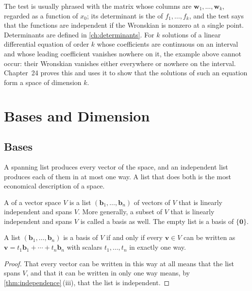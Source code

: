 The test is usually phrased with the matrix whose columns are $\mathbf w_1,\ldots,\mathbf w_k$, regarded as a function of $x_0$; its determinant is the  of $f_1,\ldots,f_k$, and the test says that the functions are independent if the Wronskian is nonzero at a single point. Determinants are defined in \cref{ch:determinants}. For $k$ solutions of a linear differential equation of order $k$ whose coefficients are continuous on an interval and whose leading coefficient vanishes nowhere on it, the example above cannot occur: their Wronskian vanishes either everywhere or nowhere on the interval. Chapter~24 proves this and uses it to show that the solutions of such an equation form a space of dimension $k$.

\section{Bases and Dimension}
\label{sec:basis-dimension}

\subsection{Bases}

A spanning list produces every vector of the space, and an independent list produces each of them in at most one way. A list that does both is the most economical description of a space.

\begin{definition}[Basis]
\label{def:basis}
A  of a vector space $V$ is a list $(\mathbf b_1,\ldots,\mathbf b_n)$ of vectors of $V$ that is linearly independent and spans $V$. More generally, a subset of $V$ that is linearly independent and spans $V$ is called a basis as well. The empty list is a basis of $\{\mathbf 0\}$.
\end{definition}

\begin{theorem}
\label{thm:basis-unique}
A list $(\mathbf b_1,\ldots,\mathbf b_n)$ is a basis of $V$ if and only if every $\mathbf v\in V$ can be written as $\mathbf v=t_1\mathbf b_1+\cdots+t_n\mathbf b_n$ with scalars $t_1,\ldots,t_n$ in exactly one way.
\end{theorem}

\begin{proof}
That every vector can be written in this way at all means that the list spans $V$, and that it can be written in only one way means, by \cref{thm:independence}\,(iii), that the list is independent.
\end{proof}

